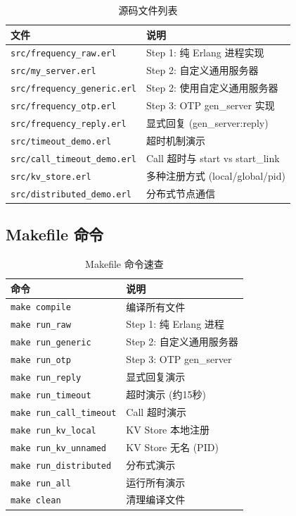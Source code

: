 \documentclass[a4paper,11pt]{article}
\begin{document}
\begin{table}[H]
\centering
\small
\begin{tabular}{@{}ll@{}}
\toprule
\textbf{文件} & \textbf{说明} \\
\midrule
\texttt{src/frequency\_raw.erl} & Step 1: 纯 Erlang 进程实现 \\
\texttt{src/my\_server.erl} & Step 2: 自定义通用服务器 \\
\texttt{src/frequency\_generic.erl} & Step 2: 使用自定义通用服务器 \\
\texttt{src/frequency\_otp.erl} & Step 3: OTP gen\_server 实现 \\
\texttt{src/frequency\_reply.erl} & 显式回复 (gen\_server:reply) \\
\texttt{src/timeout\_demo.erl} & 超时机制演示 \\
\texttt{src/call\_timeout\_demo.erl} & Call 超时与 start vs start\_link \\
\texttt{src/kv\_store.erl} & 多种注册方式 (local/global/pid) \\
\texttt{src/distributed\_demo.erl} & 分布式节点通信 \\
\bottomrule
\end{tabular}
\caption{源码文件列表}
\end{table}

\subsection{Makefile 命令}

\begin{table}[H]
\centering
\small
\begin{tabular}{@{}ll@{}}
\toprule
\textbf{命令} & \textbf{说明} \\
\midrule
\texttt{make compile} & 编译所有文件 \\
\texttt{make run\_raw} & Step 1: 纯 Erlang 进程 \\
\texttt{make run\_generic} & Step 2: 自定义通用服务器 \\
\texttt{make run\_otp} & Step 3: OTP gen\_server \\
\texttt{make run\_reply} & 显式回复演示 \\
\texttt{make run\_timeout} & 超时演示 (约15秒) \\
\texttt{make run\_call\_timeout} & Call 超时演示 \\
\texttt{make run\_kv\_local} & KV Store 本地注册 \\
\texttt{make run\_kv\_unnamed} & KV Store 无名 (PID) \\
\texttt{make run\_distributed} & 分布式演示 \\
\texttt{make run\_all} & 运行所有演示 \\
\texttt{make clean} & 清理编译文件 \\
\bottomrule
\end{tabular}
\caption{Makefile 命令速查}
\end{table}
\end{document}
